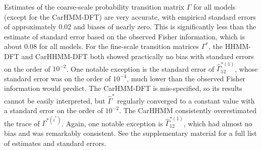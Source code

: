 Estimates of the coarse-scale probability transition matrix $\Gamma$ for all models (except for the CarHMM-DFT) are very accurate, with empirical standard errors of approximately 0.02 and biases of nearly zero. This is significantly less than the estimate of standard error based on the observed Fisher information, which is about 0.08 for all models.
For the fine-scale transition matrices $\Gamma^*$, the HHMM-DFT and CarHHMM-DFT both showed practically no bias with standard errors on the order of $10^{-2}$. One notable exception is the standard error of $\hat \Gamma^{*(1)}_{12}$, whose standard error was on the order of $10^{-4}$, much lower than the observed Fisher information would predict. The CarHMM-DFT is mis-specified, so its results cannot be easily interpreted, but $\hat \Gamma^*$ regularly converged to a constant value with a standard error on the order of $10^{-2}$. The CarHHMM consistently overestimated the trace of $\Gamma^{*(i^*)}$. Again, one notable exception is $\hat \Gamma^{*(1)}_{12}$, which had almost no bias and was remarkably consistent. See the supplementary material for a full list of estimates and standard errors.

\fi